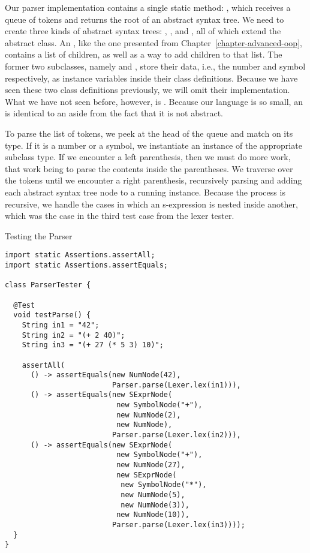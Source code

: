 Our parser implementation contains a single static method: , which receives a queue of tokens and returns the root of an abstract syntax tree. We need to create three kinds of abstract syntax trees: , , and , all of which extend the abstract  class. An , like the one presented from Chapter~\ref{chapter-advanced-oop}, contains a list of children, as well as a way to add children to that list. The former two subclasses, namely  and , store their data, i.e., the number and symbol respectively, as instance variables inside their class definitions. Because we have seen these two class definitions previously, we will omit their implementation. What we have not seen before, however, is . Because our language is so small, an  is identical to an  aside from the fact that it is not abstract.

To parse the list of tokens, we peek at the head of the queue and match on its type. If it is a number or a symbol, we instantiate an instance of the appropriate subclass type. If we encounter a left parenthesis, then we must do more work, that work being to parse the contents inside the parentheses. We traverse over the tokens until we encounter a right parenthesis, recursively parsing and adding each abstract syntax tree node to a running  instance. Because the process is recursive, we handle the cases in which an s-expression is nested inside another, which was the case in the third test case from the lexer tester.

\begin{cl}{Testing the Parser}
\begin{lstlisting}[language=MyJava]
import static Assertions.assertAll;
import static Assertions.assertEquals;

class ParserTester {

  @Test
  void testParse() {
    String in1 = "42";
    String in2 = "(+ 2 40)";
    String in3 = "(+ 27 (* 5 3) 10)";

    assertAll(
      () -> assertEquals(new NumNode(42), 
                         Parser.parse(Lexer.lex(in1))),
      () -> assertEquals(new SExprNode(
                          new SymbolNode("+"),
                          new NumNode(2),
                          new NumNode), 
                         Parser.parse(Lexer.lex(in2))),
      () -> assertEquals(new SExprNode(
                          new SymbolNode("+"),
                          new NumNode(27),
                          new SExprNode(
                           new SymbolNode("*"),
                           new NumNode(5),
                           new NumNode(3)),
                          new NumNode(10)), 
                         Parser.parse(Lexer.lex(in3))));
  }
}
\end{lstlisting}
\end{cl}

